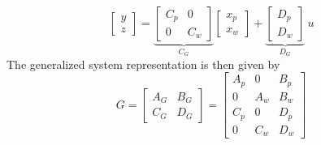 \begin{examplesection}
    \begin{equation*}
        \begin{bmatrix}
            y \\
            z
        \end{bmatrix}
        = \underbrace{\begin{bmatrix}
                C_p & 0   \\
                0   & C_w
            \end{bmatrix}}_{C_G}
        \begin{bmatrix}
            x_p \\
            x_w
        \end{bmatrix}
        +
        \underbrace{\begin{bmatrix}
                D_p \\
                D_w
            \end{bmatrix}}_{D_G}
        \: u
    \end{equation*}
    The generalized system representation is then given by
    \begin{equation*}
        G = \left[
            \begin{array}{c|c} %
                A_G & B_G \\
                \hline %
                C_G & D_G
            \end{array}
            \right]
        =
        \left[
            \begin{array}{cc|c} %
                A_p & 0   & B_p \\
                0   & A_w & B_w \\
                \hline %
                C_p & 0   & D_p \\
                0   & C_w & D_w
            \end{array}
            \right]
    \end{equation*}

\end{examplesection}

